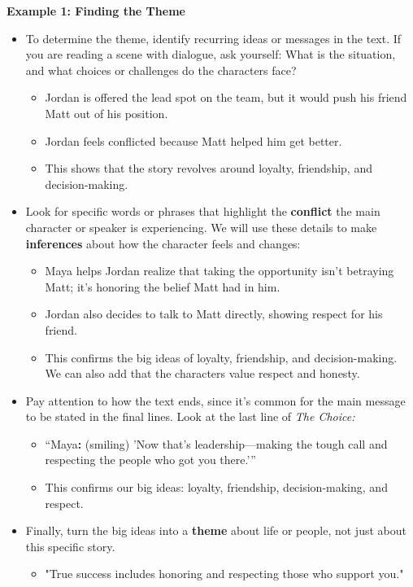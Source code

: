 \documentclass[12pt]{article}
\begin{document}
\begin{tcolorbox}[colframe=black!60, colback=white, 
coltitle=black, colbacktitle=black!15, fonttitle=\bfseries\Large, 
title=Examples, halign title=center, left=10pt, right=10pt, top=10pt, bottom=15pt]

\textbf{Example 1: Finding the Theme}  
\begin{itemize}
    \item To determine the theme, identify recurring ideas or messages in the text. If you are reading a scene with dialogue, ask yourself: What is the situation, and what choices or challenges do the characters face?  
    \begin{itemize}

    \item Jordan is offered the lead spot on the team, but it would push his friend Matt out of his position.
    \item Jordan feels conflicted because Matt helped him get better. 
    \item This shows that the story revolves around loyalty, friendship, and decision-making.
    \end{itemize}
    \item Look for specific words or phrases that highlight the \textbf{conflict} the main character or speaker is experiencing. We will use these details to make \textbf{inferences} about how the character feels and changes:
    \begin{itemize}

    \item Maya helps Jordan realize that taking the opportunity isn’t betraying Matt; it’s honoring the belief Matt had in him.
    \item Jordan also decides to talk to Matt directly, showing respect for his friend. 
    \item This confirms the big ideas of loyalty, friendship, and decision-making. We can also add that the characters value respect and honesty.
    \end{itemize}
    \item Pay attention to how the text ends, since it's common for the main message to be stated in the final lines. Look at the last line of \textit{The Choice:}
    \begin{itemize}
        \item “Maya\textbf{:} (smiling) 'Now that’s leadership—making the tough call and respecting the people who got you there.'” 
        \item This confirms our big ideas: loyalty, friendship, decision-making, and respect.  
    \end{itemize}
\item Finally, turn the big ideas into a \textbf{theme} about life or people, not just about this specific story. 
\begin{itemize}
    \item "True success includes honoring and respecting those who support you."
\end{itemize}
\end{itemize}

\end{tcolorbox}
\end{document}
